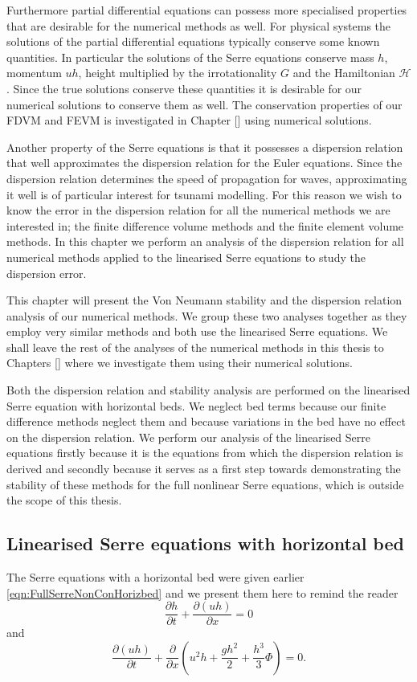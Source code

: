 Furthermore partial differential equations can possess more specialised properties that are desirable for the numerical methods as well. For physical systems the solutions of the partial differential equations typically conserve some known quantities. In particular the solutions of the Serre equations conserve mass $h$, momentum $uh$, height multiplied by the irrotationality $G$ \cite{Carter-Cienfuegos-2011-259} and the Hamiltonian $\mathcal{H}$. Since the true solutions conserve these quantities it is desirable for our numerical solutions to conserve them as well. The conservation properties of our FDVM and FEVM is investigated in Chapter [] using numerical solutions.

Another property of the Serre equations is that it possesses a dispersion relation that well approximates the dispersion relation for the Euler equations. Since the dispersion relation determines the speed of propagation for waves, approximating it well is of particular interest for tsunami modelling. For this reason we wish to know the error in the dispersion relation for all the numerical methods we are interested in; the finite difference volume methods and the finite element volume methods. In this chapter we perform an analysis of the dispersion relation for all numerical methods applied to the linearised Serre equations to study the dispersion error. 

This chapter will present the Von Neumann stability and the dispersion relation analysis of our numerical methods. We group these two analyses together as they employ very similar methods and both use the linearised Serre equations. We shall leave the rest of the analyses of the numerical methods in this thesis to Chapters [] where we investigate them using their numerical solutions.

Both the dispersion relation and stability analysis are performed on the linearised Serre equation with horizontal beds. We neglect bed terms because our finite difference methods neglect them and because variations in the bed have no effect on the dispersion relation. We perform our analysis of the linearised Serre equations firstly because it is the equations from which the dispersion relation is derived and secondly because it serves as a first step towards demonstrating the stability of these methods for the full nonlinear Serre equations, which is outside the scope of this thesis. 
 
\subsection{Linearised Serre equations with horizontal bed}
The Serre equations with a horizontal bed were given earlier \eqref{eqn:FullSerreNonConHorizbed} and we present them here to remind the reader
\begin{equation*}
\frac{\partial h}{\partial t} + \dfrac{\partial (uh)}{\partial x} = 0
\end{equation*}
and
\begin{equation*}
\dfrac{\partial (uh)}{\partial t} + \dfrac{\partial}{\partial x} \left ( u^2h + \dfrac{gh^2}{2} + \dfrac{h^3}{3}{ \Phi }  \right ) = 0.
\end{equation*}

